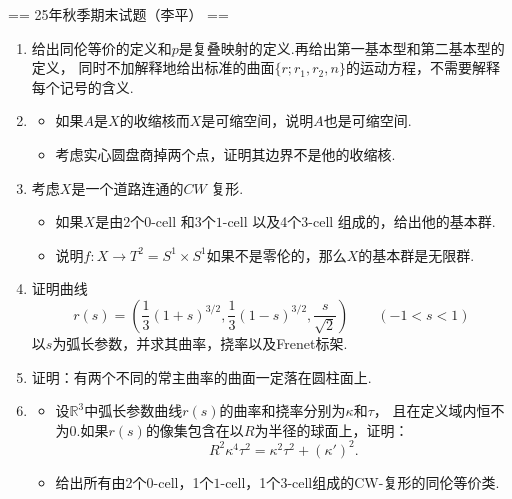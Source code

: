 
== 25年秋季期末试题（李平） ==
\begin{enumerate}
    \item 给出同伦等价的定义和$p$是复叠映射的定义.再给出第一基本型和第二基本型的定义，
    同时不加解释地给出标准的曲面$\{r;r_1,r_2,n\}$的运动方程，不需要解释每个记号的含义.  
    \item 
    \begin{itemize}
        \item 如果$A$是$X$的收缩核而$X$是可缩空间，说明$A$也是可缩空间.
        \item 考虑实心圆盘商掉两个点，证明其边界不是他的收缩核.
    \end{itemize}
    \item 考虑$X$是一个道路连通的$CW$ 复形.
    \begin{itemize}
        \item 如果$X$是由2个$0$-cell 和3个$1$-cell 以及4个$3$-cell 组成的，给出他的基本群.
        \item 说明$f:X\to T^2=S^1\times S^1$如果不是零伦的，那么$X$的基本群是无限群.
    \end{itemize}
    \item 证明曲线\[
    r(s)=\left(\frac{1}{3}(1+s)^{3/2},\frac{1}{3}(1-s)^{3/2},\frac{s}{\sqrt{2}}\right)\qquad (-1<s<1)
    \]
    以$s$为弧长参数，并求其曲率，挠率以及Frenet标架.
    \item 证明：有两个不同的常主曲率的曲面一定落在圆柱面上.
    \item 
    \begin{itemize}
    \item 设$\mathbb{R}^3$中弧长参数曲线$r(s)$的曲率和挠率分别为$\kappa$和$\tau$，
    且在定义域内恒不为$0$.如果$r(s)$的像集包含在以$R$为半径的球面上，证明：
    \[
    R^2\kappa^4\tau^2=\kappa^2\tau^2+(\kappa')^2.
    \]
    \item 给出所有由2个$0$-cell，1个$1$-cell，1个$3$-cell组成的CW-复形的同伦等价类.
    \end{itemize}
\end{enumerate}

